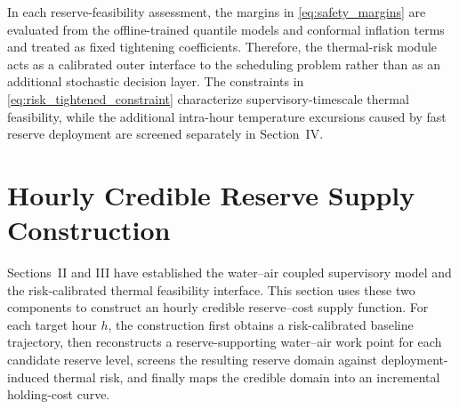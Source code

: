 \documentclass[journal]{IEEEtran}
\theoremstyle{remark}
\begin{document}
	In each reserve-feasibility assessment, the margins in
	\eqref{eq:safety_margins} are evaluated from the offline-trained
	quantile models and conformal inflation terms and treated as fixed
	tightening coefficients. Therefore, the thermal-risk module acts as a
	calibrated outer interface to the scheduling problem rather than as an
	additional stochastic decision layer. The constraints in
	\eqref{eq:risk_tightened_constraint} characterize
	supervisory-timescale thermal feasibility, while the additional
	intra-hour temperature excursions caused by fast reserve deployment
	are screened separately in Section~IV.
	
	\section{Hourly Credible Reserve Supply Construction}
	\label{sec:hourly_reserve}
	
	Sections~II and III have established the water--air coupled supervisory model and the risk-calibrated thermal feasibility interface. This section uses these two components to construct an hourly credible reserve--cost supply function. For each target hour \(h\), the construction first obtains a risk-calibrated baseline trajectory, then reconstructs a reserve-supporting water--air work point for each candidate reserve level, screens the resulting reserve domain against deployment-induced thermal risk, and finally maps the credible domain into an incremental holding-cost curve.
	
	
	
	
\end{document}
